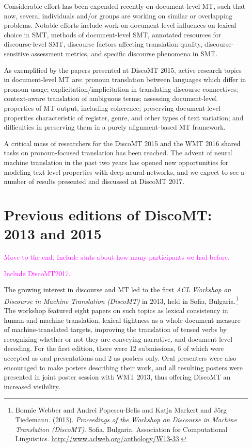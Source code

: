 \documentclass[11pt]{article}
\begin{document}
Considerable effort has been expended recently on document-level MT, such that now, several
individuals and/or groups are working on similar or overlapping problems.
Notable efforts include work on document-level influences on lexical choice in SMT, methods of document-level
SMT, annotated resources for discourse-level SMT, discourse factors affecting translation quality,
discourse-sensitive assessment metrics, and specific discourse phenomena in SMT.

As exemplified by the papers presented at DiscoMT 2015, active research topics in document-level MT are: 
pronoun translation between languages which differ in pronoun usage; 
explicitation/implicitation in translating discourse connectives; 
context-aware translation of ambiguous terms; assessing document-level properties of MT
output, including coherence; preserving document-level
properties characteristic of register, genre, and other types of text variation; and difficulties 
in preserving them in a purely alignment-based MT framework.

A critical mass of researchers for the DiscoMT 2015 and the WMT 2016 shared tasks
on pronoun-focused translation has been reached.  The advent of neural machine 
translation in the past two years has opened new opportunities for modeling 
text-level properties with deep neural networks, and we expect to see a number
of results presented and discussed at DiscoMT 2017.


\section{Previous editions of DiscoMT: 2013 and 2015}

\textcolor{magenta}{Move to the end. Include stats about how many participants we had before.} 

\textcolor{magenta}{Include DiscoMT2017.} 

The growing interest in discourse and MT led to the first
\textit{ACL Workshop on Discourse in Machine Translation (DiscoMT)} in 2013,
held in Sofia, Bulgaria.\footnote{Bonnie Webber  and  Andrei Popescu-Belis  and  Katja Markert  and  J\"{o}rg Tiedemann. (2013). \textit{Proceedings of the Workshop on Discourse in Machine Translation (DiscoMT)}. Sofia, Bulgaria. Association for Computational Linguistics. \url{http://www.aclweb.org/anthology/W13-33}.}
The workshop
featured eight papers on such topics as lexical consistency in human and
machine translation, lexical tightness as a whole-document
measure of machine-translated targets, improving
the translation of tensed verbs by recognizing whether or not they are
conveying narrative, and document-level decoding.  For the first edition,
there were 12 submissions, 6 of which were accepted as oral presentations and
2 as posters only.  Oral presenters were also encouraged to make posters
describing their work, and all resulting posters were presented in joint
poster session with WMT 2013, thus offering DiscoMT an increased visibility.
\end{document}
